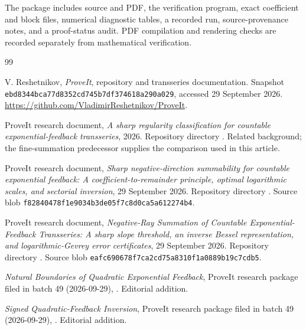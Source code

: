 \documentclass[11pt,a4paper]{article}
\numberwithin{equation}{section}
\theoremstyle{definition}\newtheorem{definition}[theorem]{Definition}
\theoremstyle{remark}\newtheorem{remark}[theorem]{Remark}
\theoremstyle{definition}
\begin{document}
The package includes source and PDF, the verification program, exact
coefficient and block files, numerical diagnostic tables, a recorded run,
source-provenance notes, and a proof-status audit. PDF compilation and
rendering checks are recorded separately from mathematical verification.

\begin{thebibliography}{99}
\raggedright
{}
V. Reshetnikov, \emph{ProveIt}, repository and transseries documentation.
Snapshot \texttt{ebd8344bca77d8352cd745b7df374618a290a029},
accessed 29 September 2026.
\url{https://github.com/VladimirReshetnikov/ProveIt}.

ProveIt research document, \emph{A sharp regularity classification for
countable exponential-feedback transseries}, 2026.
Repository directory
.
Related background; the fine-summation predecessor supplies the comparison
used in this article.

ProveIt research document, \emph{Sharp negative-direction summability for
countable exponential feedback: A coefficient-to-remainder principle,
optimal logarithmic scales, and sectorial inversion}, 29 September 2026.
Repository directory
.
Source blob \texttt{f82840478f1e9034b3de05f7c8d0ca5a612274b4}.

ProveIt research document, \emph{Negative-Ray Summation of Countable
Exponential-Feedback Transseries: A sharp slope threshold, an inverse Bessel
representation, and logarithmic-Gevrey error certificates},
29 September 2026. Repository directory
.
Source blob \texttt{eafc690678f7ca2cd75a8310f1a0889b19c7cdb5}.

\emph{Natural Boundaries of Quadratic Exponential Feedback}, ProveIt research
package filed in batch 49 (2026-09-29),
.
Editorial addition.

\emph{Signed Quadratic-Feedback Inversion}, ProveIt research package filed in
batch 49 (2026-09-29),
.
Editorial addition.


\end{thebibliography}
\end{document}
